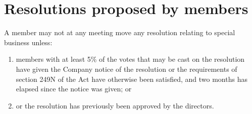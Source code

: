 \section{Resolutions proposed by members}

A member may not at any meeting move any resolution relating to special business unless:

\begin{enumerate}[label=(\alph*)]
    \item members with at least 5\% of the votes that may be cast on the resolution have given the Company notice of the resolution or the requirements of section 249N of the Act have otherwise been satisfied, and two months has elapsed since the notice was given; or
    
    \item or the resolution has previously been approved by the directors.
\end{enumerate} 
